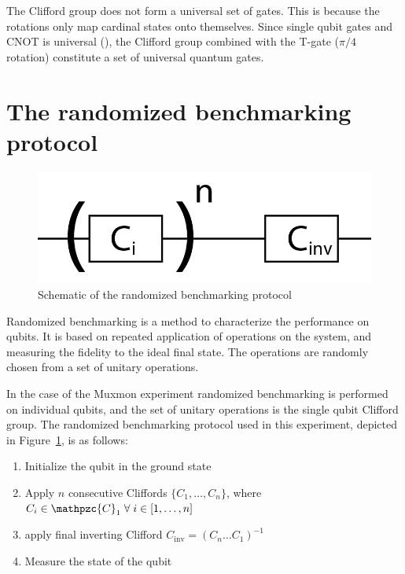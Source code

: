       The Clifford group does not form a universal set of gates. This is because the rotations only map cardinal states onto themselves. Since single qubit gates and CNOT is universal (\cite{nielsen2010quantum}), the Clifford group combined with the T-gate ($\pi/4$ rotation) constitute a set of universal quantum gates.

    \section{The randomized benchmarking protocol}
      \label{sec:randomized benchmarking protocol}

      \begin{figure}
        \begin{center}
        \vspace{-30pt}
          \includegraphics[width=.8\textwidth]{../Figures/Randomized benchmarking/RB schematic.jpg}
        \end{center}
        \vspace{-20 pt}
        \caption{Schematic of the randomized benchmarking protocol}
        \label{fig:RB schematic}
      \end{figure}

      Randomized benchmarking is a method to characterize the performance on qubits. It is based on repeated application of operations on the system, and measuring the fidelity to the ideal final state. The operations are randomly chosen from a set of unitary operations.

      In the case of the Muxmon experiment randomized benchmarking is performed on individual qubits, and the set of unitary operations is the single qubit Clifford group. The randomized benchmarking protocol used in this experiment, depicted in Figure~\ref{fig:RB schematic}, is as follows:

      \begin{enumerate}
        \item Initialize the qubit in the ground state
        \item Apply $n$ consecutive Cliffords $\{C_1, \dots, C_n\}$, where $C_i \in \mathpzc{C}_1 \; \forall \; i \in \left[1, \dots, n\right]$
        \item apply final inverting Clifford $C_\text{inv}=\left( C_n \dots C_1 \right)^{-1}$
        \item Measure the state of the qubit
      \end{enumerate}

